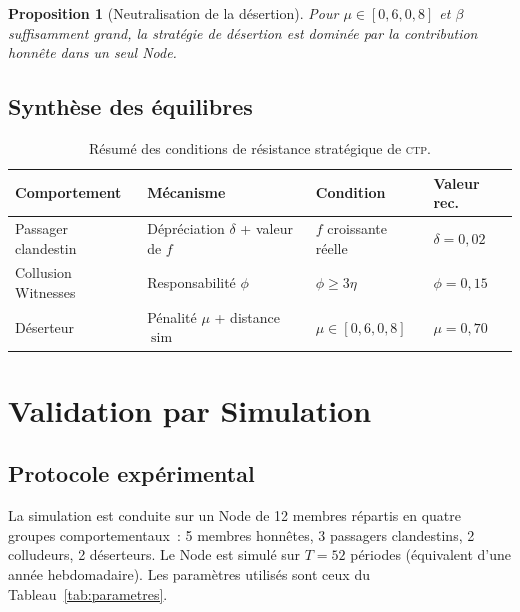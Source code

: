\documentclass[12pt,a4paper]{article}
\theoremstyle{definition}
\theoremstyle{plain}
\newtheorem{proposition}{Proposition}[section]
\theoremstyle{remark}
\newcommand{\CTP}{\textsc{ctp}}
\newcommand{\1}{\mathbf{1}}
\begin{document}
\begin{proposition}[Neutralisation de la désertion]
Pour $\mu \in [0{,}6, 0{,}8]$ et $\beta$ suffisamment grand, la stratégie de
désertion est dominée par la contribution honnête dans un seul Node.
\end{proposition}

\subsection{Synthèse des équilibres}

\begin{table}[h]
\centering
\caption{Résumé des conditions de résistance stratégique de \CTP{}.}
\label{tab:equilibres}
\begin{tabular}{llll}
\toprule
\textbf{Comportement} & \textbf{Mécanisme} & \textbf{Condition} & \textbf{Valeur rec.} \\
\midrule
Passager clandestin & Dépréciation $\delta$ + valeur de $f$ & $f$ croissante réelle & $\delta = 0{,}02$ \\
Collusion Witnesses & Responsabilité $\phi$ & $\phi \geq 3\eta$ & $\phi = 0{,}15$ \\
Déserteur & Pénalité $\mu$ + distance $\operatorname{sim}$ & $\mu \in [0{,}6, 0{,}8]$ & $\mu = 0{,}70$ \\
\bottomrule
\end{tabular}
\end{table}

\section{Validation par Simulation}
\label{sec:simulation}

\subsection{Protocole expérimental}

La simulation est conduite sur un Node de 12 membres répartis en quatre
groupes comportementaux~: 5 membres honnêtes, 3 passagers clandestins, 2
colludeurs, 2 déserteurs. Le Node est simulé sur $T = 52$ périodes
(équivalent d'une année hebdomadaire). Les paramètres utilisés sont ceux du
Tableau~\ref{tab:parametres}.
\end{document}
